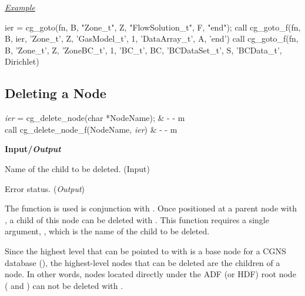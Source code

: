 \noindent
\uline{\textit{Example}}
\begin{indlefttt}
ier = cg\_goto(fn, B, "Zone\_t", Z, "FlowSolution\_t", F, "end");
call cg\_goto\_f(fn, B, ier, 'Zone\_t', Z, 'GasModel\_t', 1, 'DataArray\_t',
               A, 'end')
call cg\_goto\_f(fn, B, 'Zone\_t', Z, 'ZoneBC\_t', 1, 'BC\_t', BC,
               'BCDataSet\_t', S, 'BCData\_t', Dirichlet)
\end{indlefttt}

\subsection{Deleting a Node}
\label{s:delete}

\begin{fctbox}
\textcolor{output}{\textit{ier}} = cg\_delete\_node(\textcolor{input}{char *NodeName}); & - - m \\
\hline
call cg\_delete\_node\_f(\textcolor{input}{NodeName}, \textcolor{output}{\textit{ier}}) & - - m \\
\end{fctbox}

\noindent
\textbf{\textcolor{input}{Input}/\textcolor{output}{\textit{Output}}}


\begin{Ventryi}{}\raggedright
\item [\fort{NodeName}]
      Name of the child to be deleted.
      (\textcolor{input}{Input})
\item [\fort{ier}]
      Error status.
      (\textcolor{output}{\textit{Output}})
\end{Ventryi}

The function  is used is conjunction with
.
Once positioned at a parent node with , a child of
this node can be deleted with .
This function requires a single argument, , which is
the name of the child to be deleted.

Since the highest level that can be pointed to with  is
a base node for a CGNS database
(), the
highest-level nodes that can be deleted are the children of a
 node.
In other words, nodes located directly under the ADF (or HDF) root node
( and
)
can not be deleted with .

